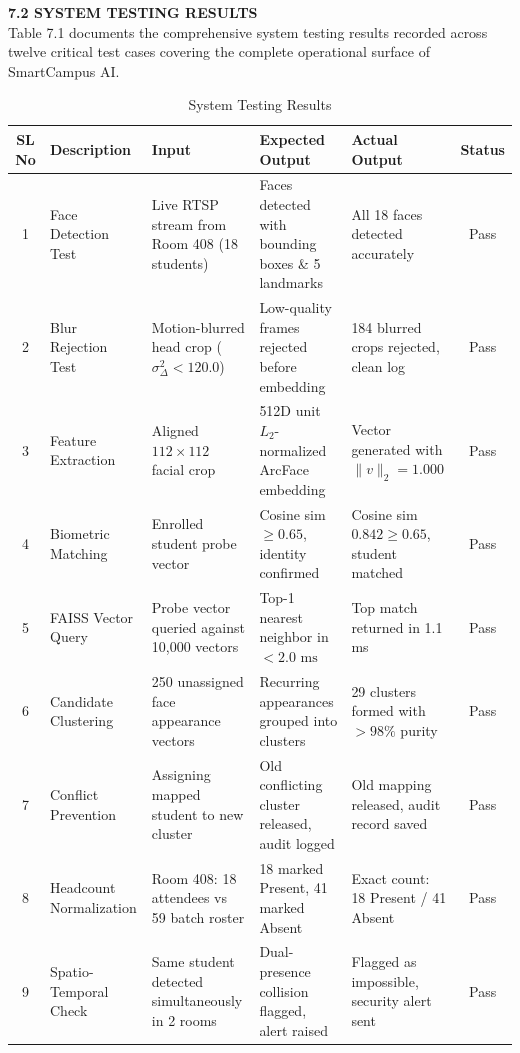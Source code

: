 \vspace{0.2in}
\noindent \textbf{7.2 SYSTEM TESTING RESULTS} \\[2mm]
Table 7.1 documents the comprehensive system testing results recorded across twelve critical test cases covering the complete operational surface of SmartCampus AI.

\begin{table}[h]
\centering
\caption{System Testing Results}
\label{tab:testing_results}
\vspace{2mm}
\setlength{\tabcolsep}{4pt}
\renewcommand{\arraystretch}{1.2}
\begin{tabular}{|c|p{2.2cm}|p{2.6cm}|p{3.2cm}|p{2.8cm}|c|}
\hline
\textbf{SL No} & \textbf{Description} & \textbf{Input} & \textbf{Expected Output} & \textbf{Actual Output} & \textbf{Status} \\
\hline
1 & Face Detection Test & Live RTSP stream from Room 408 (18 students) & Faces detected with bounding boxes \& 5 landmarks & All 18 faces detected accurately & Pass \\
\hline
2 & Blur Rejection Test & Motion-blurred head crop ($\sigma^2_\Delta < 120.0$) & Low-quality frames rejected before embedding & 184 blurred crops rejected, clean log & Pass \\
\hline
3 & Feature Extraction & Aligned $112 \times 112$ facial crop & 512D unit $L_2$-normalized ArcFace embedding & Vector generated with $\|v\|_2 = 1.000$ & Pass \\
\hline
4 & Biometric Matching & Enrolled student probe vector & Cosine sim $\ge 0.65$, identity confirmed & Cosine sim $0.842 \ge 0.65$, student matched & Pass \\
\hline
5 & FAISS Vector Query & Probe vector queried against 10,000 vectors & Top-1 nearest neighbor in $< 2.0\text{ ms}$ & Top match returned in 1.1 ms & Pass \\
\hline
6 & Candidate Clustering & 250 unassigned face appearance vectors & Recurring appearances grouped into clusters & 29 clusters formed with $>98\%$ purity & Pass \\
\hline
7 & Conflict Prevention & Assigning mapped student to new cluster & Old conflicting cluster released, audit logged & Old mapping released, audit record saved & Pass \\
\hline
8 & Headcount Normalization & Room 408: 18 attendees vs 59 batch roster & 18 marked Present, 41 marked Absent & Exact count: 18 Present / 41 Absent & Pass \\
\hline
9 & Spatio-Temporal Check & Same student detected simultaneously in 2 rooms & Dual-presence collision flagged, alert raised & Flagged as impossible, security alert sent & Pass \\

\end{tabular}
\end{table}
